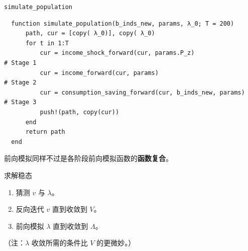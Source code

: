 \documentclass[10pt,aspectratio=169]{beamer}
\begin{document}
\begin{frame}[fragile]{\texttt{simulate\_population}}
  \begin{lstlisting}
  function simulate_population(b_inds_new, params, λ_0; T = 200)
      path, cur = [copy( λ_0)], copy( λ_0)
      for t in 1:T
          cur = income_shock_forward(cur, params.P_z)                  # Stage 1
          cur = income_forward(cur, params)                            # Stage 2
          cur = consumption_saving_forward(cur, b_inds_new, params)    # Stage 3
          push!(path, copy(cur))
      end
      return path
  end
  \end{lstlisting}
  前向模拟同样不过是各阶段前向模拟函数的\textbf{函数复合}。
\end{frame}


\begin{frame}{求解稳态}
  \begin{enumerate}
    \item 猜测 $v$ 与 $\lambda$。
    \item 反向迭代 $v$ 直到收敛到 $V$。
    \item 前向模拟 $\lambda$ 直到收敛到 $\Lambda$。
  \end{enumerate}
  （注：$\lambda$ 收敛所需的条件比 $V$ 的更微妙。）
\end{frame}
\end{document}

